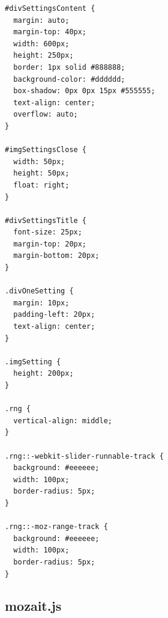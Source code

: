 \documentclass[12pt, a4paper]{article}
\begin{document}
\begin{scriptsize}
\begin{ttfamily}
\begin{lstlisting}
#divSettingsContent {
  margin: auto;
  margin-top: 40px;
  width: 600px;
  height: 250px;
  border: 1px solid #888888;
  background-color: #dddddd;
  box-shadow: 0px 0px 15px #555555;
  text-align: center;
  overflow: auto;
}

#imgSettingsClose {
  width: 50px;
  height: 50px;
  float: right;
}

#divSettingsTitle {
  font-size: 25px;
  margin-top: 20px;
  margin-bottom: 20px;
}

.divOneSetting {
  margin: 10px;
  padding-left: 20px;
  text-align: center;
}

.imgSetting {
  height: 200px;
}

.rng {
  vertical-align: middle;
}

.rng::-webkit-slider-runnable-track {
  background: #eeeeee;
  width: 100px;
  border-radius: 5px;
}

.rng::-moz-range-track {
  background: #eeeeee;
  width: 100px;
  border-radius: 5px;
}
\end{lstlisting}
\end{ttfamily}
\end{scriptsize}

\subsection{mozait.js}
\end{document}
